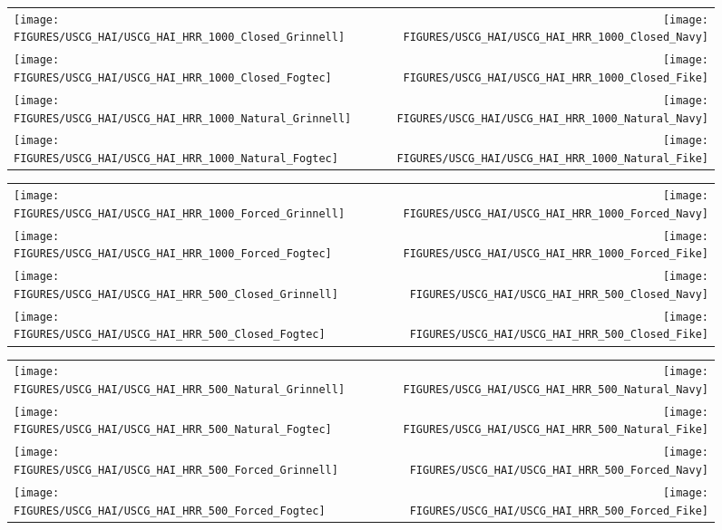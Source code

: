 


\newpage

\begin{figure}[p]
\begin{tabular*}{\textwidth}{l@{\extracolsep{\fill}}r}
\texttt{[image: FIGURES/USCG\_HAI/USCG\_HAI\_HRR\_1000\_Closed\_Grinnell]} &
\texttt{[image: FIGURES/USCG\_HAI/USCG\_HAI\_HRR\_1000\_Closed\_Navy]} \\
\texttt{[image: FIGURES/USCG\_HAI/USCG\_HAI\_HRR\_1000\_Closed\_Fogtec]} &
\texttt{[image: FIGURES/USCG\_HAI/USCG\_HAI\_HRR\_1000\_Closed\_Fike]} \\
\texttt{[image: FIGURES/USCG\_HAI/USCG\_HAI\_HRR\_1000\_Natural\_Grinnell]} &
\texttt{[image: FIGURES/USCG\_HAI/USCG\_HAI\_HRR\_1000\_Natural\_Navy]} \\
\texttt{[image: FIGURES/USCG\_HAI/USCG\_HAI\_HRR\_1000\_Natural\_Fogtec]} &
\texttt{[image: FIGURES/USCG\_HAI/USCG\_HAI\_HRR\_1000\_Natural\_Fike]}
\end{tabular*}
\label{USCG_HAI_2}
\end{figure}

\begin{figure}[p]
\begin{tabular*}{\textwidth}{l@{\extracolsep{\fill}}r}
\texttt{[image: FIGURES/USCG\_HAI/USCG\_HAI\_HRR\_1000\_Forced\_Grinnell]} &
\texttt{[image: FIGURES/USCG\_HAI/USCG\_HAI\_HRR\_1000\_Forced\_Navy]} \\
\texttt{[image: FIGURES/USCG\_HAI/USCG\_HAI\_HRR\_1000\_Forced\_Fogtec]} &
\texttt{[image: FIGURES/USCG\_HAI/USCG\_HAI\_HRR\_1000\_Forced\_Fike]} \\
\texttt{[image: FIGURES/USCG\_HAI/USCG\_HAI\_HRR\_500\_Closed\_Grinnell]} &
\texttt{[image: FIGURES/USCG\_HAI/USCG\_HAI\_HRR\_500\_Closed\_Navy]} \\
\texttt{[image: FIGURES/USCG\_HAI/USCG\_HAI\_HRR\_500\_Closed\_Fogtec]} &
\texttt{[image: FIGURES/USCG\_HAI/USCG\_HAI\_HRR\_500\_Closed\_Fike]}
\end{tabular*}
\label{USCG_HAI_4}
\end{figure}

\begin{figure}[p]
\begin{tabular*}{\textwidth}{l@{\extracolsep{\fill}}r}
\texttt{[image: FIGURES/USCG\_HAI/USCG\_HAI\_HRR\_500\_Natural\_Grinnell]} &
\texttt{[image: FIGURES/USCG\_HAI/USCG\_HAI\_HRR\_500\_Natural\_Navy]} \\
\texttt{[image: FIGURES/USCG\_HAI/USCG\_HAI\_HRR\_500\_Natural\_Fogtec]} &
\texttt{[image: FIGURES/USCG\_HAI/USCG\_HAI\_HRR\_500\_Natural\_Fike]} \\
\texttt{[image: FIGURES/USCG\_HAI/USCG\_HAI\_HRR\_500\_Forced\_Grinnell]} &
\texttt{[image: FIGURES/USCG\_HAI/USCG\_HAI\_HRR\_500\_Forced\_Navy]} \\
\texttt{[image: FIGURES/USCG\_HAI/USCG\_HAI\_HRR\_500\_Forced\_Fogtec]} &
\texttt{[image: FIGURES/USCG\_HAI/USCG\_HAI\_HRR\_500\_Forced\_Fike]}
\end{tabular*}
\label{USCG_HAI_6}
\end{figure}

